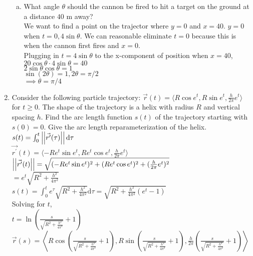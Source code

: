 \begin{enumerate}
\begin{enumerate}[a.]
		\item What angle $\theta$ should the cannon be fired to hit a target on the ground at a distance $40\text{ m}$ away?\\
		\indent
		We want to find a point on the trajector where $y=0$ and $x=40$.
		$y=0$ when $t=0,4\sin{\theta}$. We can reasonable eliminate $t=0$ because this is when the cannon first fires and $x=0$.\\
		Plugging in $t=4\sin{\theta}$ to the x-component of position when $x=40$,\\
		$20\cos{\theta}\cdot 4\sin{\theta}=40$\\
		$2\sin{\theta}\cos{\theta}=1$\\
		$\sin{(2\theta)}=1, 2\theta=\pi/2$\\
		$\implies \theta=\pi/4$\\
	\end{enumerate}
	
	\item Consider the following particle trajectory: $\vec{r}(t)=\langle R\cos{e^t},R\sin{e^t},\frac{h}{2\pi}e^t\rangle$ for $t\geq 0$. The shape of the trajectory is a helix with radius $R$ and vertical spacing $h$. Find the arc length function $s(t)$ of the trajectory starting with $s(0)=0$. Give the arc length reparameterization of the helix.\\
	\indent
	$s(t)=\int_{0}^{t}{\left|\left|\vec{r^\prime}(\tau)\right|\right|\mathrm{d}\tau}$\\
	$\vec{r^\prime}(t)=\langle -Re^{t}\sin{e^t},Re^{t}\cos{e^t},\frac{h}{2\pi}e^{t}\rangle$\\
	$\left|\left|\vec{r^\prime}(t)\right|\right|=\sqrt{(-Re^{t}\sin{e^t})^2+(Re^{t}\cos{e^t})^2+(\frac{h}{2\pi}e^t)^2}$\\
	$=e^{t}\sqrt{R^2+\frac{h^2}{4\pi^2}}$\\
	$s(t)=\int_{0}^{t}{e^{\tau}\sqrt{R^2+\frac{h^2}{4\pi^2}}\mathrm{d}\tau}=\sqrt{R^2+\frac{h^2}{4\pi^2}(e^{t}-1)}$\\
	Solving for $t$,\\
	$t=\ln{\left(\frac{s}{\sqrt{R^2+\frac{h^2}{4\pi^2}}}+1\right)}$\\
	$\vec{r}(s)=\left<R\cos{\left(\frac{s}{\sqrt{R^2+\frac{h^2}{4\pi^2}}}+1\right)},R\sin{\left(\frac{s}{\sqrt{R^2+\frac{h^2}{4\pi^2}}}+1\right)},\frac{h}{2\pi}\left(\frac{s}{\sqrt{R^2+\frac{h^2}{4\pi^2}}}+1\right)\right>$\\
	

\end{enumerate}
